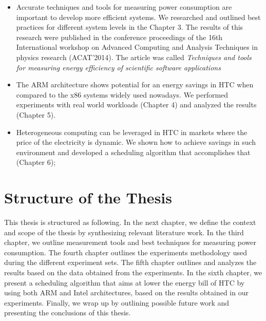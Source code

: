 \begin{itemize}
  \item Accurate techniques and tools for measuring power consumption are important to develop more efficient systems. We researched and outlined best practices for different system levels in the Chapter 3. The results of this research were published in the conference proceedings of the 16th International workshop on Advanced Computing and Analysis Techniques in physics research (ACAT'2014). The article was called \textit{Techniques and tools for measuring energy efficiency of scientific software applications}

  \item The ARM architecture shows potential for an energy savings in HTC when compared to the x86 systems widely used nowadays. We performed experiments with real world workloads (Chapter 4) and analyzed the results (Chapter 5). 

  \item Heterogeneous computing can be leveraged in HTC in markets where the price of the electricity is dynamic. We shown how to achieve savings in such environment and developed a scheduling algorithm that accomplishes that (Chapter 6);
\end{itemize}



\section{Structure of the Thesis}
This thesis is structured as following. In the next chapter, we define the context and scope
of the thesis by synthesizing relevant literature work. In the third chapter, we
outline measurement tools and best techniques for measuring power consumption. The fourth chapter outlines the
experiments methodology used during the different experiment sets. The fifth chapter outlines and analyzes the results based on
the data obtained from the experiments. In the sixth chapter, we present a scheduling algorithm that aims at lower the energy bill of HTC by using both ARM and Intel architectures, based on the results obtained in our experiments. Finally, we wrap up by outlining possible future work and presenting the
conclusions of this thesis.
